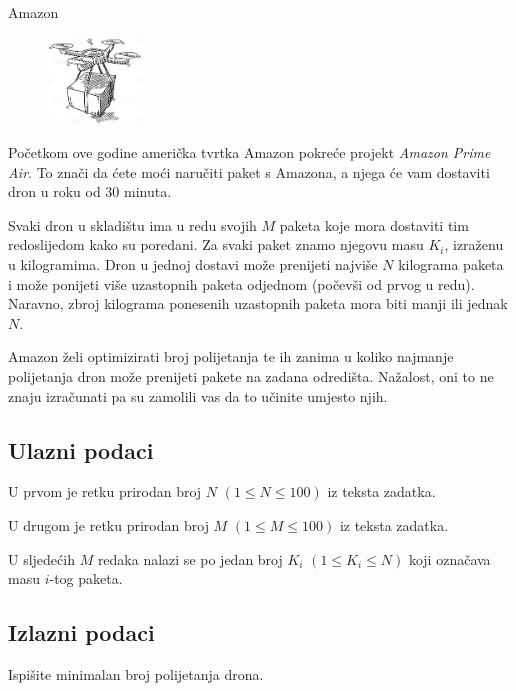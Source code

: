 \begin{statement}[
  problempoints=30,
  timelimit=1 sekunda,
  memorylimit=512 MiB,
]{Amazon}

\setlength\intextsep{-0.1cm}
\begin{figure}
\centering
\includegraphics[width=0.22\textwidth]{img/amazon.png}
\end{figure}

Početkom ove godine američka tvrtka Amazon pokreće projekt \textit{Amazon
Prime Air}.  To znači da ćete moći naručiti paket s Amazona, a njega će vam
dostaviti dron u roku od $30$ minuta.

Svaki dron u skladištu ima u redu svojih $M$ paketa koje mora dostaviti tim
redoslijedom kako su poredani. Za svaki paket znamo njegovu masu $K_i$,
izraženu u kilogramima. Dron u jednoj dostavi može prenijeti najviše $N$
kilograma paketa i može ponijeti više uzastopnih paketa odjednom (počevši od
prvog u redu). Naravno, zbroj kilograma ponesenih uzastopnih paketa mora biti
manji ili jednak $N$.

Amazon želi optimizirati broj polijetanja te ih zanima u koliko najmanje
polijetanja dron može prenijeti pakete na zadana odredišta. Nažalost, oni to
ne znaju izračunati pa su zamolili vas da to učinite umjesto njih.

\subsection*{Ulazni podaci}
U prvom je retku prirodan broj $N$ $(1 \le N \le 100)$ iz teksta zadatka.

U drugom je retku prirodan broj $M$ $(1 \le M \le 100)$ iz teksta zadatka.

U sljedećih $M$ redaka nalazi se po jedan broj $K_i$ $(1 \le K_i \le N)$
koji označava masu $i$-tog paketa.

\subsection*{Izlazni podaci}
Ispišite minimalan broj polijetanja drona.


\end{statement}
